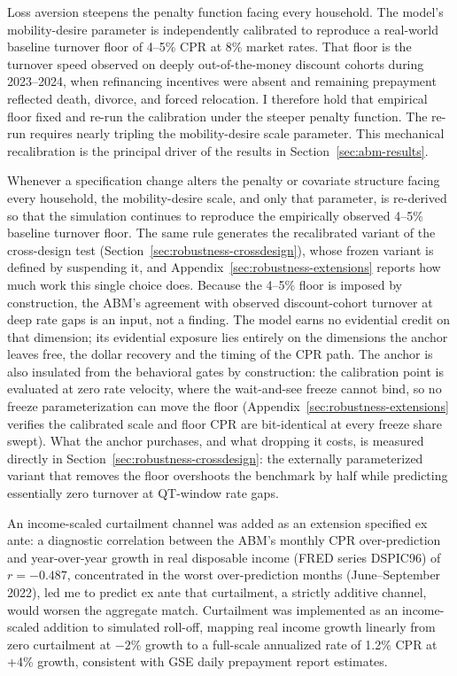 \documentclass[12pt]{article}
\begin{document}
Loss aversion steepens the penalty function facing every household. The model's mobility-desire parameter is independently calibrated to reproduce a real-world baseline turnover floor of 4--5\% CPR at 8\% market rates. That floor is the turnover speed observed on deeply out-of-the-money discount cohorts during 2023--2024, when refinancing incentives were absent and remaining prepayment reflected death, divorce, and forced relocation. I therefore hold that empirical floor fixed and re-run the calibration under the steeper penalty function. The re-run requires nearly tripling the mobility-desire scale parameter. This mechanical recalibration is the principal driver of the results in Section~\ref{sec:abm-results}.

Whenever a specification change alters the penalty or covariate structure facing every household, the mobility-desire scale, and only that parameter, is re-derived so that the simulation continues to reproduce the empirically observed 4--5\% baseline turnover floor. The same rule generates the recalibrated variant of the cross-design test (Section~\ref{sec:robustness-crossdesign}), whose frozen variant is defined by suspending it, and Appendix~\ref{sec:robustness-extensions} reports how much work this single choice does. Because the 4--5\% floor is imposed by construction, the ABM's agreement with observed discount-cohort turnover at deep rate gaps is an input, not a finding. The model earns no evidential credit on that dimension; its evidential exposure lies entirely on the dimensions the anchor leaves free, the dollar recovery and the timing of the CPR path. The anchor is also insulated from the behavioral gates by construction: the calibration point is evaluated at zero rate velocity, where the wait-and-see freeze cannot bind, so no freeze parameterization can move the floor (Appendix~\ref{sec:robustness-extensions} verifies the calibrated scale and floor CPR are bit-identical at every freeze share swept). What the anchor purchases, and what dropping it costs, is measured directly in Section~\ref{sec:robustness-crossdesign}: the externally parameterized variant that removes the floor overshoots the benchmark by half while predicting essentially zero turnover at QT-window rate gaps.

An income-scaled curtailment channel was added as an extension specified ex ante: a diagnostic correlation between the ABM's monthly CPR over-prediction and year-over-year growth in real disposable income (FRED series DSPIC96) of $r = -0.487$, concentrated in the worst over-prediction months (June--September 2022), led me to predict ex ante that curtailment, a strictly additive channel, would worsen the aggregate match. Curtailment was implemented as an income-scaled addition to simulated roll-off, mapping real income growth linearly from zero curtailment at $-2$\% growth to a full-scale annualized rate of 1.2\% CPR at +4\% growth, consistent with GSE daily prepayment report estimates.
\end{document}
